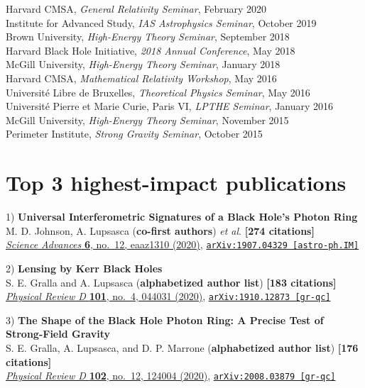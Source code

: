 \documentclass[margin,line]{resume}
\begin{document}
\begin{resume}
Harvard CMSA, \textit{General Relativity Seminar}, February 2020 \\
Institute for Advanced Study, \textit{IAS Astrophysics Seminar}, October 2019 \\
Brown University, \textit{High-Energy Theory Seminar}, September 2018 \\
Harvard Black Hole Initiative, \textit{2018 Annual Conference}, May 2018 \\
McGill University, \textit{High-Energy Theory Seminar}, January 2018 \\
Harvard CMSA, \textit{Mathematical Relativity Workshop}, May 2016 \\
Universit\'{e} Libre de Bruxelles, \textit{Theoretical Physics Seminar}, May 2016 \\
Universit\'{e} Pierre et Marie Curie, Paris VI, \textit{LPTHE Seminar}, January 2016 \\
McGill University, \textit{High-Energy Theory Seminar}, November 2015 \\
Perimeter Institute, \textit{Strong Gravity Seminar}, October 2015

\section{\mysidestyle Top 3 highest-impact publications}

1) \textbf{Universal Interferometric Signatures of a Black Hole's Photon Ring} \\
M. D. Johnson, A. Lupsasca (\textbf{co-first authors}) \textit{et al}. \textbf{[274 citations]} \\
\href{https://doi.org/10.1126/sciadv.aaz1310}{\textit{Science Advances} \textbf{6}, no.~12, eaaz1310 (2020)}, \texttt{\href{https://arxiv.org/abs/arXiv:1907.04329}{arXiv:1907.04329 [astro-ph.IM]}}

2) \textbf{Lensing by Kerr Black Holes} \\
S. E. Gralla and A. Lupsasca (\textbf{alphabetized author list}) \textbf{[183 citations]} \\
\href{https://doi.org/10.1103/PhysRevD.101.044031}{\textit{Physical Review D} \textbf{101}, no.~4, 044031 (2020)}, \texttt{\href{https://arxiv.org/abs/1910.12873}{arXiv:1910.12873 [gr-qc]}}

3) \textbf{The Shape of the Black Hole Photon Ring: A Precise Test of Strong-Field Gravity} \\
S. E. Gralla, A. Lupsasca, and D. P. Marrone (\textbf{alphabetized author list}) \textbf{[176 citations]} \\
\href{https://doi.org/10.1103/PhysRevD.102.124004}{\textit{Physical Review D} \textbf{102}, no.~12, 124004 (2020)}, \texttt{\href{https://arxiv.org/abs/2008.03879}{arXiv:2008.03879 [gr-qc]}}


\end{resume}
\end{document}
